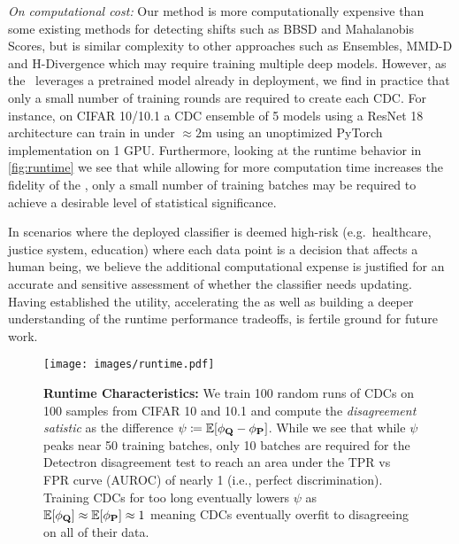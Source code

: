\emph{On computational cost: } Our method is more computationally expensive than some existing methods for detecting shifts such as BBSD and Mahalanobis Scores, but is similar complexity to other approaches such as Ensembles, MMD-D and H-Divergence which may require training multiple deep models.
However, as the \method\ leverages a pretrained model already in deployment, we find in practice that only a small number of training rounds are required to create each CDC.
For instance, on CIFAR 10/10.1 a CDC ensemble of 5 models using a ResNet 18 architecture can train in under $\approx 2$m using an unoptimized PyTorch implementation on 1 GPU.
Furthermore, looking at the runtime behavior in \autoref{fig:runtime} we see that while allowing for more computation time increases the fidelity of the \method,
only a small number of training batches may be required to achieve a desirable level of statistical significance.

In scenarios where the deployed classifier is deemed high-risk (e.g.\ healthcare, justice system, education)
where each data point is a decision that affects a human being, we believe the additional computational expense is justified for an accurate and sensitive assessment of whether the classifier needs updating.
Having established the utility, accelerating the \method\;as well as building a deeper understanding of the runtime performance tradeoffs, is fertile ground for future work.

\begin{figure}[!htb]
    \vspace{-2mm}
    \centering
    \hspace*{2mm}\texttt{[image: images/runtime.pdf]}
    \vspace{-7mm}
    \caption{\small \textbf{Runtime Characteristics:} We train 100 random runs of CDCs on 100 samples from CIFAR 10 and 10.1 and compute the \textit{disagreement satistic} as the difference $\psi\coloneqq \mathbb{E}[\phi_{\mathbf{Q}} - \phi_{\mathbf{P}}]$.
    While we see that while $\psi$ peaks near 50 training batches, only 10 batches are required for the Detectron disagreement test to reach an area under the TPR vs FPR curve (AUROC) of nearly 1 (i.e., perfect discrimination).
    Training CDCs for too long eventually lowers $\psi$ as $\mathbb{E}[\phi_{\mathbf{Q}}] \approx \mathbb{E}[\phi_{\mathbf{P}}]\approx 1$ meaning CDCs eventually overfit to disagreeing on all of their data.}
    \label{fig:runtime}
\end{figure}